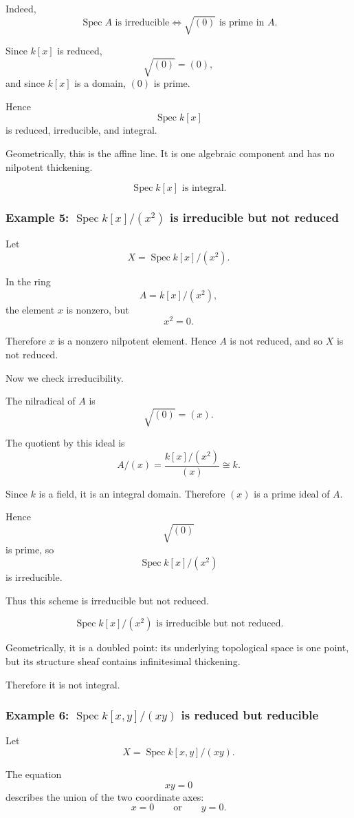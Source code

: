 \documentclass[12pt,a4paper]{article}
\DeclareMathOperator{\Spec}{Spec}
\providecommand{\Spec}{\operatorname{Spec}}
\theoremstyle{notespace}
\begin{document}
Indeed,
\[
\Spec A\text{ is irreducible}
\iff
\sqrt{(0)}\text{ is prime in }A.
\]

Since \(k[x]\) is reduced,
\[
\sqrt{(0)}=(0),
\]
and since \(k[x]\) is a domain, \((0)\) is prime.

Hence
\[
\Spec k[x]
\]
is reduced, irreducible, and integral.

Geometrically, this is the affine line. It is one algebraic component and has no nilpotent thickening.

\[
\boxed{
	\Spec k[x]\text{ is integral.}
}
\]

\subsubsection*{Example 5: \(\Spec k[x]/(x^2)\) is irreducible but not reduced}

Let
\[
X=\Spec k[x]/(x^2).
\]

In the ring
\[
A=k[x]/(x^2),
\]
the element \(x\) is nonzero, but
\[
x^2=0.
\]

Therefore \(x\) is a nonzero nilpotent element. Hence \(A\) is not reduced, and so \(X\) is not reduced.

Now we check irreducibility.

The nilradical of \(A\) is
\[
\sqrt{(0)}=(x).
\]

The quotient by this ideal is
\[
A/(x)
=
\frac{k[x]/(x^2)}{(x)}
\cong k.
\]

Since \(k\) is a field, it is an integral domain. Therefore \((x)\) is a prime ideal of \(A\).

Hence
\[
\sqrt{(0)}
\]
is prime, so
\[
\Spec k[x]/(x^2)
\]
is irreducible.

Thus this scheme is irreducible but not reduced.

\[
\boxed{
	\Spec k[x]/(x^2)\text{ is irreducible but not reduced.}
}
\]

Geometrically, it is a doubled point: its underlying topological space is one point, but its structure sheaf contains infinitesimal thickening.

Therefore it is not integral.

\subsubsection*{Example 6: \(\Spec k[x,y]/(xy)\) is reduced but reducible}

Let
\[
X=\Spec k[x,y]/(xy).
\]

The equation
\[
xy=0
\]
describes the union of the two coordinate axes:
\[
x=0
\qquad\text{or}\qquad
y=0.
\]
\end{document}
